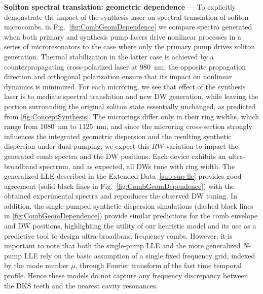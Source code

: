 \documentclass[reprint,superscriptaddress, amsmath,amssymb,pra, aps,floatfix,longbibliography]{revtex4-1}
\begin{document}
%
%
%
\noindent \textbf{Soliton spectral translation: geometric dependence} — To explicitly demonstrate the impact of the synthesis laser on spectral translation of soliton microcombs, in Fig.~\ref{fig:CombGeomDependence} we compare spectra generated when both primary and synthesis pump lasers drive nonlinear processes in a series of microresonators to the case where only the primary pump drives soliton generation. Thermal stabilization in the latter case is achieved by a counterpropagating cross-polarized laser at 980~nm; the opposite propagation direction and orthogonal polarization ensure that its impact on nonlinear dynamics is minimized. For each microring, we see that effect of the synthesis laser is to mediate spectral translation and new DW generation, while leaving the portion surrounding the original soliton state essentially unchanged, as predicted from \cref{fig:ConceptSynthesis}. The microrings differ only in their ring widths, which range from 1080~nm to 1125~nm, and since the microring cross-section strongly influences the integrated geometric dispersion and the resulting synthetic dispersion under dual pumping, we expect this $RW$ variation to impact the generated comb spectra and the DW positions. Each device exhibits an ultra-broadband spectrum, and as expected, all DWs tune with ring width. The generalized LLE described in the Extended Data~\cref{sub:sup-lle} provides good agreement (solid black lines in Fig.~\ref{fig:CombGeomDependence}) with the obtained experimental spectra and reproduces the observed DW tuning. In addition, the single-pumped synthetic dispersion simulations (dashed black lines in \cref{fig:CombGeomDependence}) provide similar predictions for the comb envelope and DW positions, highlighting the utility of our heuristic model and its use as a predictive tool to design ultra-broadband frequency combs. However, it is important to note that both the single-pump LLE and the more generalized $N$-pump LLE rely on the basic assumption of a single fixed frequency grid, indexed by the mode number $\mu$, through Fourier transform of the fast time temporal profile. Hence these models do not capture any frequency discrepancy between the DKS teeth and the nearest cavity resonances. %
\end{document}
